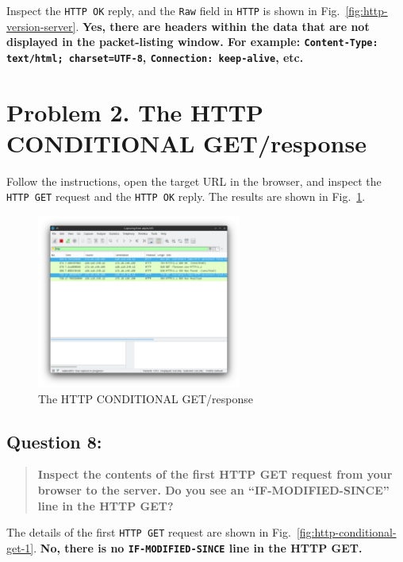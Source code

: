 \documentclass{cshwk}
\begin{document}
Inspect the \texttt{HTTP OK} reply, and the \texttt{Raw} field in \texttt{HTTP} is shown in Fig.~\ref{fig:http-version-server}. \textbf{Yes, there are headers within the data that are not displayed in the packet-listing window. For example: \texttt{Content-Type: text/html; charset=UTF-8}, \texttt{Connection: keep-alive}, etc.}



\section*{Problem 2. The HTTP CONDITIONAL GET/response}

Follow the instructions, open the target URL in the browser, and inspect the \texttt{HTTP GET} request and the \texttt{HTTP OK} reply. The results are shown in Fig.~\ref{fig:http-conditional-get}.


\begin{figure}[htbp]
    \centering
    \includegraphics[width=0.6\textwidth]{lab2-4.png}
    \caption{The HTTP CONDITIONAL GET/response}
    \label{fig:http-conditional-get}
\end{figure}

\subsection*{Question 8:}
\begin{quote}
    \textbf{Inspect the contents of the first HTTP GET request from your browser to the server. Do you see an “IF-MODIFIED-SINCE” line in the HTTP GET?}
\end{quote}

The details of the first \texttt{HTTP GET} request are shown in Fig.~\ref{fig:http-conditional-get-1}. \textbf{No, there is no \texttt{IF-MODIFIED-SINCE} line in the HTTP GET.}
\end{document}
